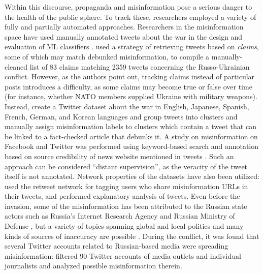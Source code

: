 
Within this discourse, propaganda and misinformation pose a serious danger to the health of the public sphere. 
To track these, researchers employed a variety of fully and partially automated approaches. 
Researchers in the misinformation space have used manually annotated tweets about the war in the design and evaluation of ML classifiers \citet{darwish2023identifying,toraman2024mide22}.
\citet{la2023retrieving} used a strategy of retrieving tweets based on \emph{claims}, some of which may match debunked misinformation, to compile a manually-cleaned list of \num{83} claims matching \num{2359} tweets concerning the Russo-Ukrainian conflict.
However, as the authors point out, tracking claims instead of particular posts introduces a difficulty, as some claims may become true or false over time (for instance, whether NATO members supplied Ukraine with military weapons). 
Instead, \citet{lai2024multilingual} create a Twitter dataset about the war in English, Japanese, Spanish, French, German, and Korean languages %
and group tweets into clusters %
and manually assign misinformation labels to clusters which contain a tweet that can be linked to a fact-checked article that debunks it. 
A study on misinformation on Facebook and Twitter was performed using keyword-based search and annotation based on source credibility of news website mentioned in tweets \cite{pierri2023propaganda}. 
Such an approach can be considered ``distant supervision'', as the veracity of the tweet itself is not annotated.
Network properties of the datasets have also been utilized: \citet{lai2024multilingual} used the retweet network for tagging users who share misinformation URLs in their tweets, and performed explanatory analysis of tweets. 
Even before the invasion, some of the misinformation has been attributed to the Russian state actors such as Russia's Internet Research Agency \cite{linvill2020troll,boyte2017analysis} and Russian Ministry of Defense \cite{alieva2022investigating}, but a variety of topics spanning global and local politics and many kinds of sources of inaccuracy are possible \cite{lai2024multilingual}. 
During the conflict, it was found that several Twitter accounts related to Russian-based media were spreading misinformation: \citet{aguerri2024fight} filtered 90 Twitter accounts of media outlets and individual journalists and analyzed possible misinformation therein. 

